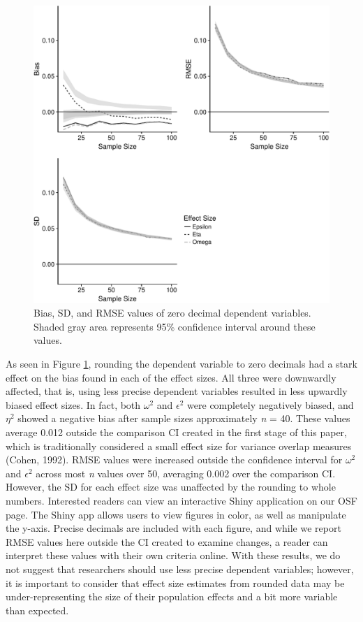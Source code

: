\documentclass[english,man]{apa6}
\theoremstyle{definition}
\theoremstyle{definition}
\theoremstyle{definition}
\theoremstyle{remark}
\begin{document}
\begin{figure}
\centering
\includegraphics{buchanan_scofield_version2_files/figure-latex/decimal-graph-1.pdf}
\caption{\label{fig:decimal-graph}Bias, SD, and RMSE values of zero decimal
dependent variables. Shaded gray area represents 95\% confidence
interval around these values.}
\end{figure}

As seen in Figure \ref{fig:decimal-graph}, rounding the dependent
variable to zero decimals had a stark effect on the bias found in each
of the effect sizes. All three were downwardly affected, that is, using
less precise dependent variables resulted in less upwardly biased effect
sizes. In fact, both \(\omega^2\) and \(\epsilon^2\) were completely
negatively biased, and \(\eta^2\) showed a negative bias after sample
sizes approximately \emph{n} = 40. These values average 0.012 outside
the comparison CI created in the first stage of this paper, which is
traditionally considered a small effect size for variance overlap
measures (Cohen, 1992). RMSE values were increased outside the
confidence interval for \(\omega^2\) and \(\epsilon^2\) across most
\emph{n} values over 50, averaging 0.002 over the comparison CI.
However, the SD for each effect size was unaffected by the rounding to
whole numbers. Interested readers can view an interactive Shiny
application on our OSF page. The Shiny app allows users to view figures
in color, as well as manipulate the y-axis. Precise decimals are
included with each figure, and while we report RMSE values here outside
the CI created to examine changes, a reader can interpret these values
with their own criteria online. With these results, we do not suggest
that researchers should use less precise dependent variables; however,
it is important to consider that effect size estimates from rounded data
may be under-representing the size of their population effects and a bit
more variable than expected.
\end{document}
